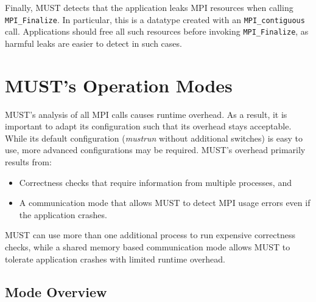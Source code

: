 \documentclass[english]{scrartcl}
\begin{document}

Finally, MUST detects that the application leaks MPI resources when calling
\texttt{MPI\_Finalize}. In particular,
this is a datatype created with an \texttt{MPI\_contiguous} call. Applications
should free all such resources before invoking \texttt{MPI\_Finalize}, as
harmful leaks are easier to detect
in such cases.

\section{MUST's Operation Modes}
\label{section:must-modes}

MUST's analysis of all MPI calls causes runtime overhead. As a result, it is
important to adapt its configuration such that its overhead stays acceptable.
While its default configuration (\emph{mustrun} without additional switches) is
easy to use, more advanced configurations may be required. MUST's overhead
primarily results from:
\begin{itemize}
  \item Correctness checks that require information from multiple processes, and
  \item A communication mode that allows MUST to detect MPI usage errors even if
  the application crashes. 
\end{itemize}

MUST can use more than one additional process to run expensive correctness
checks, while a shared memory based communication mode allows MUST to tolerate
application crashes with limited runtime overhead.

\subsection{Mode Overview}
\end{document}
